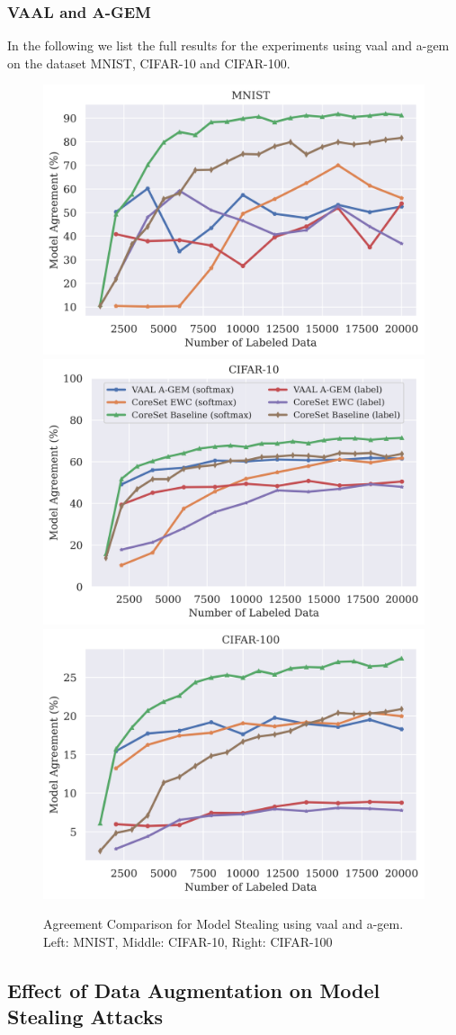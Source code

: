 \clearpage

\subsubsection{VAAL and A-GEM}
\label{sec:Appendix:CALMS:VAALAGEM}
In the following we list the full results for the experiments using \gls{vaal} and \gls{a-gem} on the dataset MNIST, CIFAR-10 and CIFAR-100.
\begin{figure}[!htb]
    \centering
    \includegraphics[width=0.32\linewidth]{images/results_CALMS/mnist_vaal_agem.png} 
    \includegraphics[width=0.32\linewidth]{images/results_CALMS/cifar_vaal_agem.png}
    \includegraphics[width=0.32\linewidth]{images/results_CALMS/cifar100_vaal_agem.png}
    \caption{Agreement Comparison for Model Stealing using \gls{vaal} and \gls{a-gem}. Left: MNIST, Middle: CIFAR-10, Right: CIFAR-100}
    \label{fig:CALMS_VAAL_AGEM}
\end{figure}

\subsection{Effect of Data Augmentation on Model Stealing Attacks}
\label{sec:Appendix:EffectDataAugmentation}

